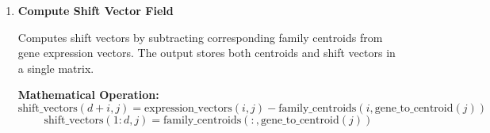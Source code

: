 \begin{enumerate}
          \textbf{Output arguments:}
          \begin{itemize}
            \item \texttt{centroid\_matrix real(real64)}: Matrix of calculated family
                  centroid vectors with size \texttt{n\_axes $\times$ n\_families}
                  
            \item \texttt{selected\_indices integer(int32)}: Array of gene indices
                  used for the calculation with length of \texttt{n\_genes}
                  
            \item \texttt{ierr integer(int32)}: Error code (for error details
                  please check \hyperref[sec:error-handling]{error handling section}
                  )
          \end{itemize}
          
          \begin{lstlisting}[language=Fortran, caption={Calculation of Family Centroids}]
call group_centroid(expression_vectors, n_axes, n_genes, &
            gene_to_family, n_families, centroid_matrix, &
            mode, selected_indices, ierr, ortholog_set)
          \end{lstlisting}
          
    \item \textbf{Compute Shift Vector Field}

        Computes shift vectors by subtracting corresponding family centroids from gene expression vectors. The output stores both centroids and shift vectors in a single matrix.
        
        \textbf{Mathematical Operation:}
        \[ \text{shift\_vectors}(d+i, j) = \text{expression\_vectors}(i, j) - \text{family\_centroids}(i, \text{gene\_to\_centroid}(j)) \]
        \[ \text{shift\_vectors}(1:d, j) = \text{family\_centroids}(:, \text{gene\_to\_centroid}(j)) \]
        

\end{enumerate}

